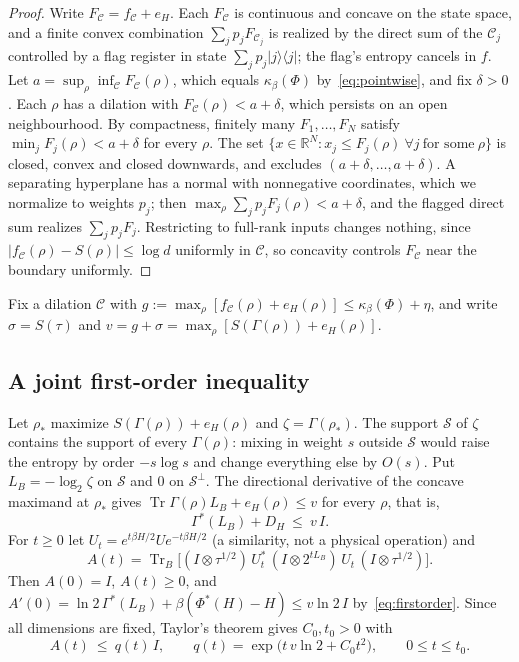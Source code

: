 \documentclass[11pt]{article}
\theoremstyle{definition}
\theoremstyle{remark}
\newcommand{\Tr}{\operatorname{Tr}}
\newcommand{\Trt}{\kappa_\beta}
\newcommand{\Dil}{\mathcal C}
\begin{document}
\begin{proof}
Write $F_{\Dil}=f_{\Dil}+e_H$. Each $F_{\Dil}$ is continuous and concave on the state space, and a finite convex combination $\sum_jp_jF_{\Dil_j}$ is realized by the direct sum of the $\Dil_j$ controlled by a flag register in state $\sum_jp_j|j\rangle\langle j|$; the flag's entropy cancels in $f$. Let $a=\sup_\rho\inf_{\Dil}F_{\Dil}(\rho)$, which equals $\Trt(\Phi)$ by~\eqref{eq:pointwise}, and fix $\delta>0$. Each $\rho$ has a dilation with $F_{\Dil}(\rho)<a+\delta$, which persists on an open neighbourhood. By compactness, finitely many $F_1,\dots,F_N$ satisfy $\min_jF_j(\rho)<a+\delta$ for every $\rho$. The set $\{x\in\mathbb R^N:x_j\le F_j(\rho)\ \forall j\ \text{for some}\ \rho\}$ is closed, convex and closed downwards, and excludes $(a+\delta,\dots,a+\delta)$. A separating hyperplane has a normal with nonnegative coordinates, which we normalize to weights $p_j$; then $\max_\rho\sum_jp_jF_j(\rho)<a+\delta$, and the flagged direct sum realizes $\sum_jp_jF_j$. Restricting to full-rank inputs changes nothing, since $|f_{\Dil}(\rho)-S(\rho)|\le\log d$ uniformly in $\Dil$, so concavity controls $F_{\Dil}$ near the boundary uniformly.
\end{proof}

Fix a dilation $\Dil$ with $g:=\max_\rho[f_{\Dil}(\rho)+e_H(\rho)]\le\Trt(\Phi)+\eta$, and write $\sigma=S(\tau)$ and $v=g+\sigma=\max_\rho[S(\Gamma(\rho))+e_H(\rho)]$.

\subsection{A joint first-order inequality}

Let $\rho_*$ maximize $S(\Gamma(\rho))+e_H(\rho)$ and $\zeta=\Gamma(\rho_*)$. The support $\mathcal S$ of $\zeta$ contains the support of every $\Gamma(\rho)$: mixing in weight $s$ outside $\mathcal S$ would raise the entropy by order $-s\log s$ and change everything else by $O(s)$. Put $L_B=-\log_2\zeta$ on $\mathcal S$ and $0$ on $\mathcal S^\perp$. The directional derivative of the concave maximand at $\rho_*$ gives $\Tr\Gamma(\rho)L_B+e_H(\rho)\le v$ for every $\rho$, that is,
\begin{equation}\label{eq:firstorder}
\Gamma^*(L_B)+D_H\ \le\ v\,I.
\end{equation}
For $t\ge0$ let $U_t=e^{t\beta H/2}Ue^{-t\beta H/2}$ (a similarity, not a physical operation) and
\[
A(t)=\Tr_B\bigl[(I\otimes\tau^{1/2})\,U_t^*\,(I\otimes2^{tL_B})\,U_t\,(I\otimes\tau^{1/2})\bigr].
\]
Then $A(0)=I$, $A(t)\ge0$, and $A'(0)=\ln2\,\Gamma^*(L_B)+\beta(\Phi^*(H)-H)\le v\ln2\,I$ by~\eqref{eq:firstorder}. Since all dimensions are fixed, Taylor's theorem gives $C_0,t_0>0$ with
\begin{equation}\label{eq:qt}
A(t)\ \le\ q(t)\,I,\qquad q(t)=\exp\bigl(t\,v\ln2+C_0t^2\bigr),\qquad0\le t\le t_0.
\end{equation}
\end{document}
